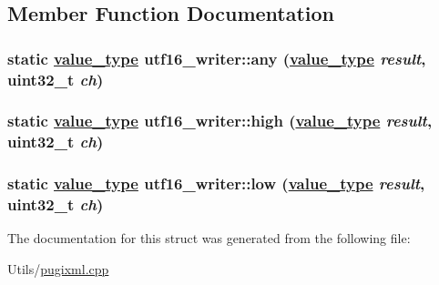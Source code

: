 \subsection{Member Function Documentation}
\hypertarget{structutf16__writer_c14e06db126fbbef4be7efdb80fbdf4a}{
\subsubsection[any]{\setlength{\rightskip}{0pt plus 5cm}static \hyperlink{structutf16__writer_527b705eaf5099167b8bc42423ce918c}{value\_\-type} utf16\_\-writer::any (\hyperlink{structutf16__writer_527b705eaf5099167b8bc42423ce918c}{value\_\-type} {\em result}, uint32\_\-t {\em ch})}}
\label{structutf16__writer_c14e06db126fbbef4be7efdb80fbdf4a}


\hypertarget{structutf16__writer_01b6ce1a567dea11daead3ca83f42d5c}{
\subsubsection[high]{\setlength{\rightskip}{0pt plus 5cm}static \hyperlink{structutf16__writer_527b705eaf5099167b8bc42423ce918c}{value\_\-type} utf16\_\-writer::high (\hyperlink{structutf16__writer_527b705eaf5099167b8bc42423ce918c}{value\_\-type} {\em result}, uint32\_\-t {\em ch})}}
\label{structutf16__writer_01b6ce1a567dea11daead3ca83f42d5c}


\hypertarget{structutf16__writer_b11fef721a8b38de5e315d2e75d12956}{
\subsubsection[low]{\setlength{\rightskip}{0pt plus 5cm}static \hyperlink{structutf16__writer_527b705eaf5099167b8bc42423ce918c}{value\_\-type} utf16\_\-writer::low (\hyperlink{structutf16__writer_527b705eaf5099167b8bc42423ce918c}{value\_\-type} {\em result}, uint32\_\-t {\em ch})}}
\label{structutf16__writer_b11fef721a8b38de5e315d2e75d12956}




The documentation for this struct was generated from the following file:\begin{CompactItemize}
\item 
Utils/\hyperlink{pugixml_8cpp}{pugixml.cpp}\end{CompactItemize}
